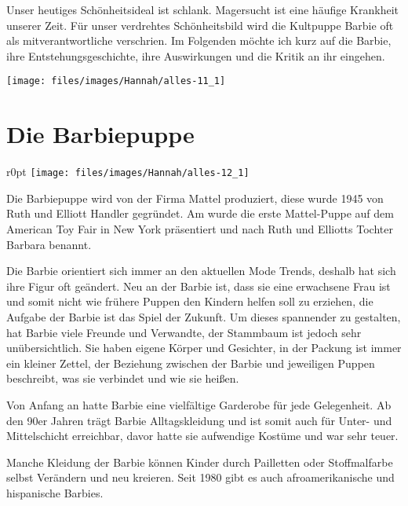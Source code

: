 Unser heutiges Schönheitsideal ist schlank. Magersucht ist eine häufige Krankheit unserer Zeit. Für
unser verdrehtes Schönheitsbild wird die Kultpuppe Barbie oft als mitverantwortliche verschrien. Im
Folgenden
möchte ich kurz auf die Barbie, ihre Entstehungsgeschichte, ihre Auswirkungen und die Kritik an ihr
eingehen.

\bigskip
\begin{figurewrapper}
	\texttt{[image: files/images/Hannah/alles-11\_1]}%
\end{figurewrapper}

\clearpage
\section{Die Barbiepuppe}

\begin{wrapfigure}{r}{0pt}
	\texttt{[image: files/images/Hannah/alles-12\_1]}%
\end{wrapfigure}
Die Barbiepuppe wird von der Firma Mattel produziert, diese wurde 1945 von Ruth und Elliott Handler
gegründet.
Am  wurde die erste Mattel-Puppe auf dem American Toy Fair in New York
präsentiert und nach Ruth und Elliotts Tochter Barbara benannt.

Die Barbie orientiert sich immer an den aktuellen Mode Trends, deshalb hat sich ihre Figur oft
geändert.
Neu an der Barbie ist, dass sie eine erwachsene Frau ist und somit nicht wie frühere Puppen den
Kindern helfen soll zu erziehen, die Aufgabe der Barbie ist das Spiel der Zukunft. Um dieses
spannender zu gestalten, hat Barbie viele Freunde und Verwandte, der Stammbaum ist jedoch sehr
unübersichtlich. Sie haben eigene Körper und Gesichter, in der Packung ist immer ein kleiner Zettel,
der Beziehung zwischen der Barbie und jeweiligen Puppen beschreibt, was sie verbindet und wie sie
heißen.

Von Anfang an hatte Barbie eine vielfältige Garderobe für jede Gelegenheit. Ab den 90er Jahren trägt
Barbie Alltagskleidung und ist somit auch für Unter- und Mittelschicht erreichbar, davor hatte sie
aufwendige Kostüme und war sehr teuer.

Manche Kleidung der Barbie können Kinder durch Pailletten oder Stoffmalfarbe selbst Verändern und neu
kreieren. Seit 1980 gibt es auch afroamerikanische und hispanische Barbies.

